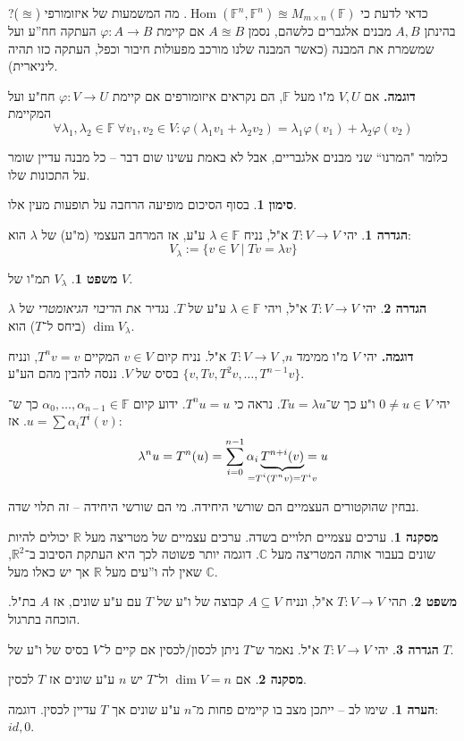 \documentclass[a4paper]{article}
\newcommand\R     {\mathbb{R}}
\newcommand\C     {\mathbb{C}}
\DeclareMathOperator{\Hom}     {Hom}
\newcommand\F         {\mathbb{F}}
\newcommand\co        {\colon}
\newcommand\ag        {\alpha}
\renewcommand\lg      {\lambda}
\renewcommand\phi     {\varphi}
\theoremstyle{definition}
\newtheorem{Theorem}{\color{myblue}משפט}
\newtheorem{Definition}{\color{mygreen}הגדרה}
\newtheorem{Remark}{\color{mycyan}הערה}
\newtheorem{Notion}{\color{myred}סימון}
\newtheorem{Collary}{\color{mymagenta}מסקנה}
\newcommand\cola [1] {\begin{Collary}#1\end{Collary}}
\newcommand\theo  [1] {\begin{Theorem}#1\end{Theorem}}
\newcommand\defi  [1] {\begin{Definition}#1\end{Definition}}
\newcommand\rmark [1] {\begin{Remark}#1\end{Remark}}
\newcommand\noti  [1] {\begin{Notion}#1\end{Notion}}
\begin{document}
	כדאי לדעת כי $\Hom(\F^n, \F^n) \approxeq M_{m \times n}(\F)$. מה המשמעות של איזומורפי ($\approxeq$)? בהינתן $A, B$ מבנים אלגברים כלשהם, נסמן $A \approxeq B$ אם קיימת $\phi \co A \to B$ העתקה חח''ע ועל שמשמרת את המבנה (כאשר המבנה שלנו מורכב מפעולות חיבור וכפל, העתקה כזו תהיה ליניארית). 
	
	\textbf{דוגמה. }אם $V, U$ מ"ו מעל $\F$, הם נקראים איזומורפים אם קיימת $\phi \co V \to U$ חח"ע ועל המקיימת
	\[ \forall \lg_1, \lg_2 \in \F\: \forall v_1, v_2 \in V \co \phi(\lg_1v_1 + \lg_2v_2) = \lg_1\phi(v_1) + \lg_2\phi(v_2) \]
	
	כלומר "המרנו`` שני מבנים אלגבריים, אבל לא באמת עשינו שום דבר – כל מבנה עדיין שומר על התכונות שלו. 
	\noti{בסוף הסיכום מופיעה הרחבה על תופעות מעין אלו. }
	
	\defi{יהי $T \co V \to V$ א"ל, נניח $\lg \in \F$ ע"ע, אז המרחב העצמי (מ"ע) של $\lg$ הוא: 
		\[ V_\lg := \{v \in V \mid Tv = \lg v\} \]}
	\theo{$V_\lg$ תמ"ו של $V$. }
	
	\defi{יהי $T \co V \to V$ א"ל, ויהי $\lg \in \F$ ע"ע של $T$. נגדיר את ה\textit{ריבוי הגיאומטרי} של $\lg$ (ביחס ל־$T$) הוא $\dim V_\lg$. }
	
	\textbf{דוגמה.}
	יהי $V$ מ"ו ממימד $n$, $T \co V \to V$ א"ל. נניח קיום $v \in V $ המקיים $T^nv = v$, ונניח $\{v, Tv, T^2v, \dots, T^{n - 1}v\}$ בסיס של $V$. ננסה להבין מהם הע"ע. 
	
	יהי $0 \neq u \in V$ ו"ע כך ש־$Tu = \lg u$. נראה כי $T^nu = u$. ידוע קיום $\ag_0, \dots, \ag_{n - 1} \in \F$ כך ש־$u = \sum \ag_iT^i(v)$. אז: 
	\[ \lg^nu = T^n(u) = \sum_{i = 0}^{n - 1}\ag_i\underbrace{T^{n + i}(v)}_{\mathclap{= T^i(T^nv) = T^iv}} = u \]
	
	נבחין שהוקטורים העצמיים הם שורשי היחידה. מי הם שורשי היחידה – זה תלוי שדה. 
	
	\cola{ערכים עצמיים תלויים בשדה. ערכים עצמיים של מטריצה מעל $\R$ יכולים להיות שונים בעבור אותה המטריצה מעל $\C$. דוגמה יותר פשוטה לכך היא העתקת הסיבוב ב־$\R^2$, שאין לה ו''עים מעל $\R$ אך יש כאלו מעל $\C$. }
	
	\theo{תהי $T \co V \to V$ א"ל, ונניח $A \subseteq V$ קבוצה של ו"ע של $T$ עם ע"ע שונים, אז $A$ בת"ל. הוכחה בתרגול. }
	
	\defi{יהי $T \co V \to V$ א"ל. נאמר ש־$T$ ניתן לכסון/לכסין אם קיים ל־$V$ בסיס של ו"ע של $T$. }
	
	\cola{אם $\dim V = n$ ול־$T$ יש $n$ ע"ע שונים אז $T$ לכסין. }
	
	\rmark{שימו לב – ייתכן מצב בו קיימים פחות מ־$n$ ע"ע שונים אך $T$ עדיין לכסין. דוגמה: $id, 0$. }
	
\end{document}
